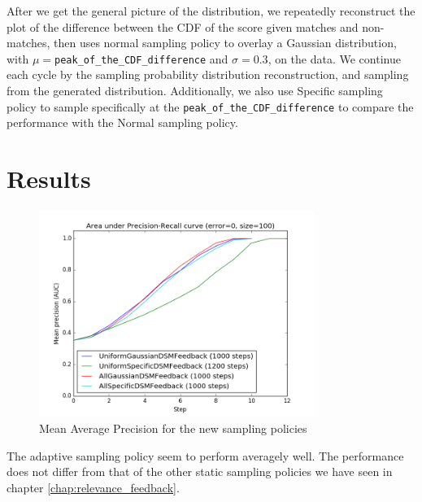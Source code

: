 After we get the general picture of the distribution, we repeatedly reconstruct
the plot of the difference between the CDF of the score given matches and
non-matches, then uses normal sampling policy to overlay a Gaussian
distribution, with $\mu=$\texttt{peak\_of\_the\_CDF\_difference} and
$\sigma=0.3$, on the data. We continue each cycle by the sampling probability
distribution reconstruction, and sampling from the generated distribution.
Additionally, we also use Specific sampling policy to sample specifically at the
\texttt{peak\_of\_the\_CDF\_difference} to compare the performance with the
Normal sampling policy.

\section{Results}

\begin{figure}[h!]
  \centering
  \includegraphics[width=0.8\textwidth]{otago}
  \caption{Mean Average Precision for the new sampling policies}
  \label{fig:otago_adaptive_aoc} %
\end{figure}

The adaptive sampling policy seem to perform averagely well. The performance
does not differ from that of the other static sampling policies we have seen in
chapter \ref{chap:relevance_feedback}.

